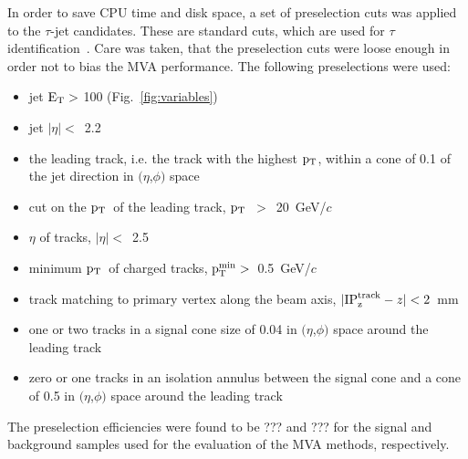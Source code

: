 \documentclass[a4paper]{jpconf}
\newcommand{\pT}{\mbox{${\rm p}_{\rm T}$}}
\begin{document}
In order to save CPU time and disk space, a set of preselection cuts
was applied to the $\tau$-jet candidates. These are standard cuts,
which are used for $\tau$ identification~\cite{tautagging}. Care was
taken, that the preselection cuts were loose enough in order not to
bias the MVA performance. The following preselections were used:
\begin{itemize}
\item jet ${\rm E}_{\rm T} >$ 100 (Fig.~\ref{fig:variables})
\item jet $|\eta|<$~2.2 
\item the leading track, i.e. the track with the highest \pT, within a
  cone of 0.1 of the jet direction in $(\eta$,$\phi)$ space
\item cut on the \pT\ of the leading track, \pT~$>$~20~GeV/$c$
\item $\eta$ of tracks, $|\eta|<$~2.5
\item minimum \pT\ of charged tracks,
  ${\rm p}_{\rm T}^{\rm min} >$~0.5~GeV/$c$
\item track matching to primary vertex along the beam axis, $|{\rm
  IP}_{\rm z}^{\rm track}-z|<2$~mm
\item one or two tracks in a signal cone size of 0.04 in $(\eta$,$\phi)$
  space around the leading track
\item zero or one tracks in an isolation annulus between the signal
  cone and a cone of 0.5 in $(\eta$,$\phi)$ space around the leading track 
\end{itemize} 
The preselection efficiencies were found to be ??? and ??? for the
signal and background samples used for the evaluation of the MVA
methods, respectively.
\end{document}
